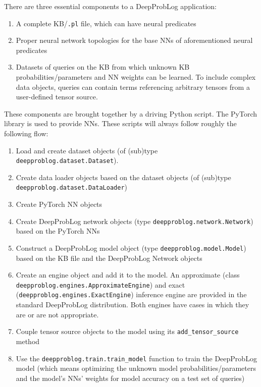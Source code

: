 There are three essential components to a DeepProbLog application:
\begin{enumerate}
  \item A complete KB/\texttt{.pl} file, which can have neural predicates
  \item Proper neural network topologies for the base NNs of aforementioned neural predicates
  \item Datasets of queries on the KB from which unknown KB probabilities/parameters and NN weights can be learned. To include complex data objects, queries can contain terms referencing arbitrary tensors from a user-defined tensor source.
\end{enumerate}
These components are brought together by a driving Python script. The PyTorch library is used to provide NNs. These scripts will always follow roughly the following flow:
\begin{enumerate}
  \item Load and create dataset objects (of (sub)type \texttt{deepproblog.dataset.Dataset}).
  \item Create data loader objects based on the dataset objects (of (sub)type \texttt{deepproblog.dataset.DataLoader})
  \item Create PyTorch NN objects
  \item Create DeepProbLog network objects (type \texttt{deepproblog.network.Network}) based on the PyTorch NNs
  \item Construct a DeepProbLog model object (type \texttt{deepproblog.model.Model}) based on the KB file and the DeepProbLog Network objects
  \item Create an engine object and add it to the model. An approximate (class \texttt{deepproblog.engines.ApproximateEngine}) and exact (\texttt{deepproblog.engines.ExactEngine}) inference engine are provided in the standard DeepProbLog distribution. Both engines have cases in which they are or are not appropriate.
  \item Couple tensor source objects to the model using its \texttt{add_tensor_source} method
  \item Use the \texttt{deepproblog.train.train_model} function to train the DeepProbLog model (which means optimizing the unknown model probabilities/parameters and the model's NNs' weights for model accuracy on a test set of queries)
\end{enumerate}

